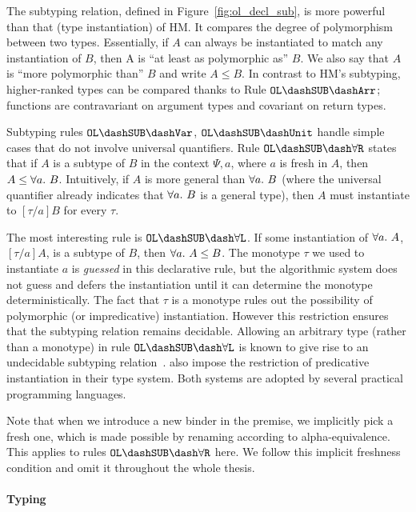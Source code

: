 The subtyping relation, defined in Figure~\ref{fig:ol_decl_sub},
is more powerful than that (type instantiation) of HM.
It compares the degree of polymorphism between two types.
Essentially, if $A$ can always be instantiated to match any instantiation of $B$,
then A is ``at least as polymorphic as'' $B$. We also 
say that $A$ is ``more polymorphic than'' $B$ and write $A \le B$.
In contrast to HM's subtyping, higher-ranked types can be compared thanks to
Rule $\mathtt{OL \dash SUB \dash Arr}$;
functions are contravariant on argument types and covariant on return types.

Subtyping rules $\mathtt{OL\dash SUB\dash Var}$,
$\mathtt{OL\dash SUB\dash Unit}$
handle simple cases that do not involve universal quantifiers.
Rule $\mathtt{OL\dash SUB\dash \forall R}$ states that if $A$ is a subtype of $B$
in the context $\Psi, a$, where $a$ is fresh in $A$, then $A\le\all B$.
Intuitively, if $A$ is more general than $\all B$ (where the universal quantifier
already indicates that $\all B$ is a general type),
then $A$ must instantiate to $[\tau/a]B$ for every $\tau$.

The most interesting rule is $\mathtt{OL\dash SUB\dash \forall L}$.
If some instantiation of $\all A$, $[\tau/a]A$, is a subtype of $B$,
then $\all A \le B$.
The monotype $\tau$ we used to instantiate $a$ is \emph{guessed} in this
declarative rule, but the algorithmic system does not guess and defers the
instantiation until it can determine the monotype deterministically.
The fact that $\tau$ is a monotype rules out the possibility of
polymorphic (or impredicative) instantiation.
However this restriction ensures that the subtyping relation remains
decidable. Allowing an arbitrary type (rather than a monotype) in
rule $\mathtt{OL\dash SUB\dash \forall L}$
is known to give rise to an undecidable
subtyping relation~\citep{chrzaszcz1998poly}.
\citet{jones2007practical} also impose the restriction of
predicative instantiation in their type system.
Both systems are adopted by several practical programming languages.


Note that when we introduce a new binder in the premise, we implicitly pick a fresh one,
which is made possible by renaming according to alpha-equivalence.
This applies to rules $\mathtt{OL\dash SUB\dash \forall R}$ here.
We follow this implicit freshness condition and omit it
throughout the whole thesis.

\paragraph{Typing}

